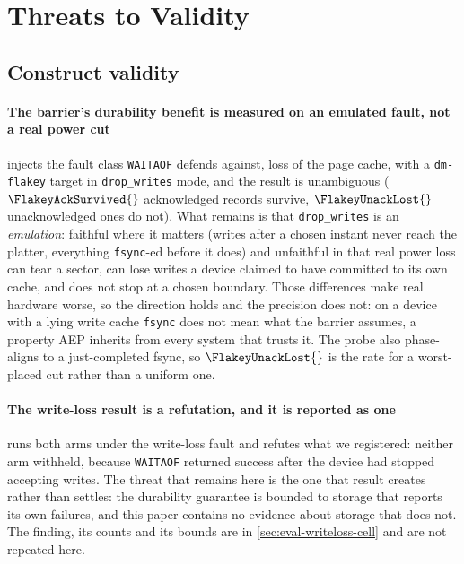 \section{Threats to Validity}
\label{sec:threats}


\subsection{Construct validity}

\paragraph{The barrier's durability benefit is measured on an emulated fault,
not a real power cut}  injects the fault class
\texttt{WAITAOF} defends against, loss of the page cache, with a
\texttt{dm-flakey} target in \texttt{drop\_writes} mode, and the result is
unambiguous ($\FlakeyAckSurvived{}$ acknowledged records survive,
$\FlakeyUnackLost{}$ unacknowledged ones do not). What remains is that
\texttt{drop\_writes} is an \emph{emulation}: faithful where it matters
(writes after a chosen instant never reach the platter, everything
\texttt{fsync}-ed before it does) and unfaithful in that real power loss can
tear a sector, can lose writes a device claimed to have committed to its own
cache, and does not stop at a chosen boundary. Those differences make real
hardware worse, so the direction holds and the precision does not: on a device
with a lying write cache \texttt{fsync} does not mean what the barrier assumes,
a property AEP inherits from every system that trusts it. The probe also
phase-aligns to a just-completed fsync, so $\FlakeyUnackLost{}$ is the rate for
a worst-placed cut rather than a uniform one.

\paragraph{The write-loss result is a refutation, and it is reported as one}
 runs both arms under the write-loss fault and
refutes what we registered: neither arm withheld, because \texttt{WAITAOF}
returned success after the device had stopped accepting writes. The threat that
remains here is the one that result creates rather than settles: the
durability guarantee is bounded to storage that reports its own failures, and
this paper contains no evidence about storage that does not. The finding, its
counts and its bounds are in \cref{sec:eval-writeloss-cell} and are not repeated
here.

